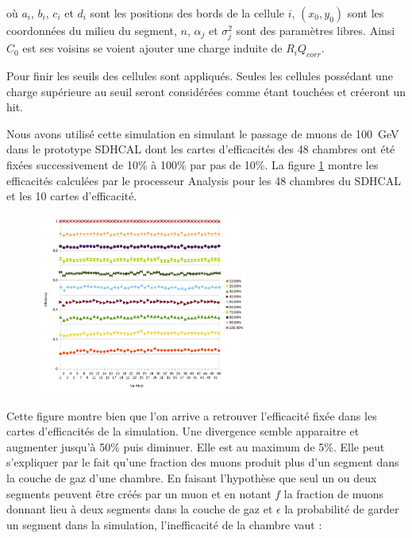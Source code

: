 où $a_i$, $b_i$, $c_i$ et $d_i$ sont les positions des bords de la cellule $i$, $(x_0,y_0)$ sont les coordonnées du milieu du segment, $n$, $\alpha_j$ et $\sigma_j^2$ sont des paramètres libres. Ainsi $C_0$ est ses voisins se voient ajouter une charge induite de $R_iQ_{corr}$.

Pour finir les seuils des cellules sont appliqués. Seules les cellules possédant une charge supérieure au seuil seront considérées comme étant touchées et créeront un hit.

Nous avons utilisé cette simulation en simulant le passage de muons de \SI{100}{\giga\eV} dans le prototype SDHCAL dont les cartes d'efficacités des \num{48} chambres ont été fixées successivement de 10\% à 100\% par pas de 10\%. La figure \ref{effisimul} montre les efficacités calculées par le processeur Analysis pour les \num{48} chambres du SDHCAL et les \num{10} cartes d'efficacité.

\begin{figure}[ht!]
	\centering
	\includegraphics[width=0.62\textwidth]{GLA/effisimul.jpg}
	\label{effisimul}
\end{figure}

Cette figure montre bien que l'on arrive a retrouver l'efficacité fixée dans les cartes d'efficacités de la simulation. Une divergence semble apparaitre et augmenter jusqu'à 50\% puis diminuer. Elle est au maximum de 5\%. Elle peut s'expliquer par le fait qu'une fraction des muons produit plus d'un segment dans la couche de gaz d'une chambre. En faisant l'hypothèse que seul un ou deux segments peuvent être créés par un muon et en notant $f$ la fraction de muons donnant lieu à deux segments dans la couche de gaz et $\epsilon$ la probabilité de garder un segment dans la simulation, l'inefficacité de la chambre vaut :

